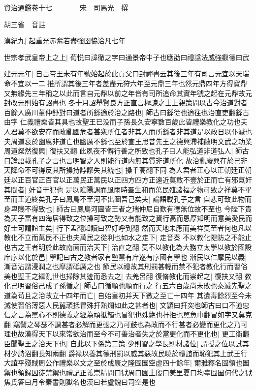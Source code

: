 資治通鑑卷十七　　　　宋　司馬光　撰

胡三省　音註

漢紀九|{
	起重光赤奮若盡強圉恊洽凡七年}


世宗孝武皇帝上之上|{
	荀悦曰諱徹之字曰通景帝中子也應劭曰禮諡法威強叡德曰武}


建元元年|{
	自古帝王未有年號始起於此貢父曰封禪書云其後三年有司言元宜以天瑞命不宜以一二推所謂其後三年者盖盡元狩六年至元鼎三年也然元鼎四年方得寶鼎又無緣先三年稱之以此而言自元鼎以前之年皆有司所追命其實年號之起在元鼎故元封改元則始有詔書也}
冬十月詔舉賢良方正直言極諫之士上親策問以古今治道對者百餘人廣川董仲舒對曰道者所繇適於治之路也|{
	師古曰繇從也適往也治直吏翻繇古由字}
仁義禮樂皆其具也故聖王已没而子孫長久安寧數百歲此皆禮樂教化之功也夫人君莫不欲安存而政亂國危者甚衆所任者非其人而所繇者非其道是以政日以仆滅也夫周道衰於幽厲非道亡也幽厲不繇也至於宣王思昔先王之德興滯補敝明文武之功業周道粲然復興|{
	復扶又翻}
此夙夜不懈行善之所致也孔子曰人能弘道非道弘人|{
	師古曰論語載孔子之言也言明智之人則能行道内無其質非道所化}
故治亂廢興在於己非天降命不可得反其所操持誖謬失其統也|{
	操千高翻下同}
為人君者正心以正朝廷正朝廷以正百官正百官以正萬民正萬民以正四方四方正遠近莫敢不壹於正而亡有邪氣奸其間者|{
	奸音干犯也}
是以隂陽調而風雨時羣生和而萬民殖諸福之物可致之祥莫不畢至而王道終矣孔子曰鳳鳥不至河不出圖吾己矣夫|{
	論語載孔子之言}
自悲可致此物而身卑賤不得致也|{
	師古曰鳳鳥河圖皆王者之瑞仲尼自歎有德無位故不至也}
今陛下貴為天子富有四海居得致之位操可致之勢又有能致之資行高而恩厚知明而意美愛民而好士可謂誼主矣|{
	行下孟翻知讀曰智好呼到翻}
然而天地未應而美祥莫至者何也凡以教化不立而萬民不正也夫萬民之從利也如水之走下|{
	走音奏}
不以教化隄防之不能止也古之王者明於此故南面而治天下|{
	治直之翻}
莫不以教化為大務立太學以教於國設庠序以化於邑|{
	學記曰古之教者家有塾黨有庠遂有序國有學也}
漸民以仁摩民以義|{
	漸音沾謂浸潤之也摩謂砥厲之也}
節民以禮故其刑罰甚輕而禁不犯者教化行而習俗美也聖王之繼亂世也掃除其迹而悉去之|{
	去羌呂翻}
復脩教化而崇起之|{
	復扶又翻}
教化己明習俗己成子孫循之|{
	師古曰循順也順而行之}
行五六百歲尚未敗也秦滅先聖之道為苟且之治故立十四年而亡|{
	自始皇初并天下數之至亡十四年}
其遺毒餘烈至今未滅使習俗薄惡人民嚚頑抵冒殊扞熟爛如此之甚者也|{
	文頴曰扞突也師古曰口不道忠信之言為嚚心不則德義之經為頑抵觸也冒犯也殊絶也扞拒也嚚魚巾翻冒如字又莫克翻}
竊譬之琴瑟不調甚者必解而更張之乃可鼓也為政而不行甚者必變而更化之乃可理也故漢得天下以來常欲治而至今不可善治者失之於當更化而不更化也|{
	更工衡翻}
臣聞聖王之治天下也|{
	自此以下係第二策}
少則習之學長則材諸位|{
	謂授之位以試其材少詩沼翻長知兩翻}
爵禄以養其德刑罰以威其惡故民曉於禮誼而恥犯其上武王行大誼平殘賊周公作禮樂以文之至於成康之隆囹圄空虚四十餘年|{
	爾雅釋名囹領也圄禦也領録囚徒禁禦也禮記正義崇精問曰獄周曰園土殷曰羑里夏曰均臺囹圄何代之獄焦氏答曰月令秦書則獄名也漢曰若盧魏曰司空是也}
